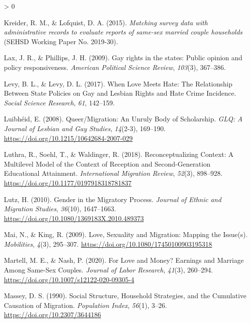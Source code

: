 \documentclass[
  11pt,
]{article}
\newlength{\cslhangindent}
\newenvironment{CSLReferences}[2] %
 {%
  \setlength{\parindent}{0pt}
  \ifodd #1 \everypar{\setlength{\hangindent}{\cslhangindent}}\ignorespaces\fi
  \ifnum #2 > 0
  \setlength{\parskip}{#2\baselineskip}
  \fi
 }%
 {}
\begin{document}
\begin{CSLReferences}{1}{0}
\leavevmode\hypertarget{ref-kreider_2015}{}%
Kreider, R. M., \& Lofquist, D. A. (2015). \emph{Matching survey data with administrative records to evaluate reports of same-sex married couple households} (SEHSD Working Paper No. 2019-30).

\leavevmode\hypertarget{ref-lax_2009}{}%
Lax, J. R., \& Phillips, J. H. (2009). Gay rights in the states: {Public} opinion and policy responsiveness. \emph{American Political Science Review}, \emph{103}(3), 367--386.

\leavevmode\hypertarget{ref-levy_2017}{}%
Levy, B. L., \& Levy, D. L. (2017). When {Love Meets Hate}: {The Relationship Between State Policies} on {Gay} and {Lesbian Rights} and {Hate Crime Incidence}. \emph{Social Science Research}, \emph{61}, 142--159.

\leavevmode\hypertarget{ref-luibheid_2008}{}%
Luibhéid, E. (2008). Queer/{Migration}: {An Unruly Body} of {Scholarship}. \emph{GLQ: A Journal of Lesbian and Gay Studies}, \emph{14}(2-3), 169--190. \url{https://doi.org/10.1215/10642684-2007-029}

\leavevmode\hypertarget{ref-luthra_2018}{}%
Luthra, R., Soehl, T., \& Waldinger, R. (2018). Reconceptualizing {Context}: {A Multilevel Model} of the {Context} of {Reception} and {Second}-{Generation Educational Attainment}. \emph{International Migration Review}, \emph{52}(3), 898--928. \url{https://doi.org/10.1177/0197918318781837}

\leavevmode\hypertarget{ref-lutz_2010}{}%
Lutz, H. (2010). Gender in the {Migratory Process}. \emph{Journal of Ethnic and Migration Studies}, \emph{36}(10), 1647--1663. \url{https://doi.org/10.1080/1369183X.2010.489373}

\leavevmode\hypertarget{ref-mai_2009}{}%
Mai, N., \& King, R. (2009). Love, {Sexuality} and {Migration}: {Mapping} the {Issue}(s). \emph{Mobilities}, \emph{4}(3), 295--307. \url{https://doi.org/10.1080/17450100903195318}

\leavevmode\hypertarget{ref-martell_2020}{}%
Martell, M. E., \& Nash, P. (2020). For {Love} and {Money}? {Earnings} and {Marriage Among Same}-{Sex Couples}. \emph{Journal of Labor Research}, \emph{41}(3), 260--294. \url{https://doi.org/10.1007/s12122-020-09305-4}

\leavevmode\hypertarget{ref-massey_1990_social}{}%
Massey, D. S. (1990). Social {Structure}, {Household Strategies}, and the {Cumulative Causation} of {Migration}. \emph{Population Index}, \emph{56}(1), 3--26. \url{https://doi.org/10.2307/3644186}


\end{CSLReferences}
\end{document}
